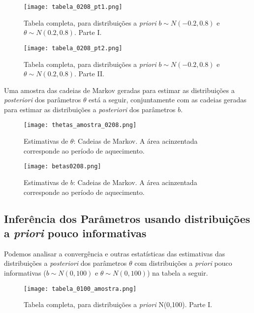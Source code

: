 \documentclass[
	12pt,				%
	openright,			%
	twoside,			%
	a4paper,			%
	english,			%
	brazil				%
	]{abntex2}
\begin{document}
\begin{anexosenv}
 \begin{figure}[!htbp]
    \centering
    \texttt{[image: tabela\_0208\_pt1.png]}
    \caption{Tabela completa, para distribuições a \textit{priori} $b \sim N(-0.2, 0.8)$ e $\theta \sim N(0.2, 0.8)$. Parte I.}
    \label{fig:tabelacompleta0208}
 \end{figure}
 
 \begin{figure}[!htbp]
    \centering
    \texttt{[image: tabela\_0208\_pt2.png]}
    \caption{Tabela completa, para distribuições a \textit{priori} $b \sim N(-0.2, 0.8)$ e $\theta \sim N(0.2, 0.8)$. Parte II.}
    \label{fig:tabelacompleta02082}
 \end{figure}
 
 Uma amostra das cadeias de Markov geradas para estimar as distribuições a \textit{posteriori} dos parâmetros $\theta$ está a seguir, conjuntamente com as cadeias geradas para estimar as distribuições a \textit{posteriori} dos parâmetros $b$.
 
 \begin{figure}[!htbp]
    \centering
    \texttt{[image: thetas\_amostra\_0208.png]}
    \caption{Estimativas de $\theta$: Cadeias de Markov. A área acinzentada corresponde ao período de aquecimento.}
    \label{fig:thetasquatro0208}
 \end{figure}
 
 \begin{figure}[!htbp]
    \centering
    \texttt{[image: betas0208.png]}
    \caption{Estimativas de $b$: Cadeias de Markov. A área acinzentada corresponde ao período de aquecimento.}
    \label{fig:betasquatro0208}
 \end{figure}
 
 \newpage
 \subsection{Inferência dos Parâmetros usando distribuições a \emph{priori} pouco informativas}\label{extrapoucoinfo}
 Podemos analisar a convergência e outras estatísticas das estimativas das distribuições a \textit{posteriori} dos parâmetros $\theta$ com distribuições a \textit{priori} pouco informativas ($b \sim N(0, 100)$ e $\theta \sim N(0, 100)$) na tabela a seguir.
 
 \begin{figure}[!htbp]
    \centering
    \texttt{[image: tabela\_0100\_amostra.png]}
    \caption{Tabela completa, para distribuições a \textit{priori} N(0,100). Parte I.}
    \label{fig:tabelacompleta0100}
 \end{figure}
 

\end{anexosenv}
\end{document}
